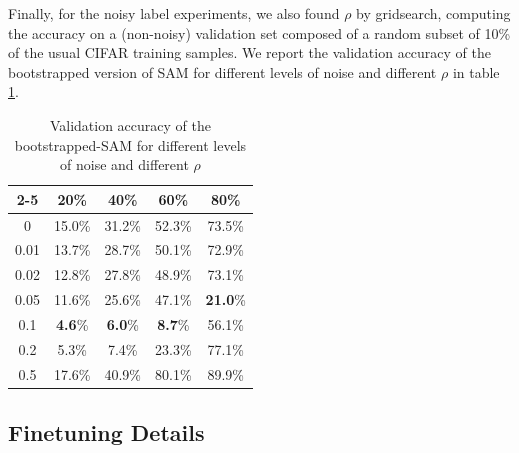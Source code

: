\documentclass{article} %
\begin{document}
Finally, for the noisy label experiments, we also found $\rho$ by gridsearch, computing the accuracy on a (non-noisy) validation set composed of a random subset of 10\% of the usual CIFAR training samples. We report the validation accuracy of the bootstrapped version of SAM for different levels of noise and different $\rho$ in table \ref{tab:val_noise}.


\begin{table}[h]
\centering
\begin{tabular}{c|cccc|}
\cline{2-5}
                           & \multicolumn{1}{c|}{20\%} & \multicolumn{1}{c|}{40\%} & \multicolumn{1}{c|}{60\%} & 80\%   \\ \hline
\multicolumn{1}{|c|}{0}    & 15.0\%                    & 31.2\%                    & 52.3\%                    & 73.5\% \\
\multicolumn{1}{|c|}{0.01} & 13.7\%                    & 28.7\%                    & 50.1\%                    & 72.9\% \\
\multicolumn{1}{|c|}{0.02} & 12.8\%                    & 27.8\%                    & 48.9\%                    & 73.1\% \\
\multicolumn{1}{|c|}{0.05} & 11.6\%                    & 25.6\%                    & 47.1\%                    & \textbf{21.0}\% \\
\multicolumn{1}{|c|}{0.1}  & \textbf{4.6}\%                     & \textbf{6.0}\%                     & \textbf{8.7}\%                     & 56.1\% \\
\multicolumn{1}{|c|}{0.2}  & 5.3\%                     & 7.4\%                     & 23.3\%                    & 77.1\% \\
\multicolumn{1}{|c|}{0.5}  & 17.6\%                    & 40.9\%                    & 80.1\%                    & 89.9\% \\ \hline
\end{tabular}
\caption{Validation accuracy of the bootstrapped-SAM for different levels of noise and different $\rho$}
\label{tab:val_noise}
\end{table}

\subsection{Finetuning Details}
\label{appendix:finetuning}
\end{document}
